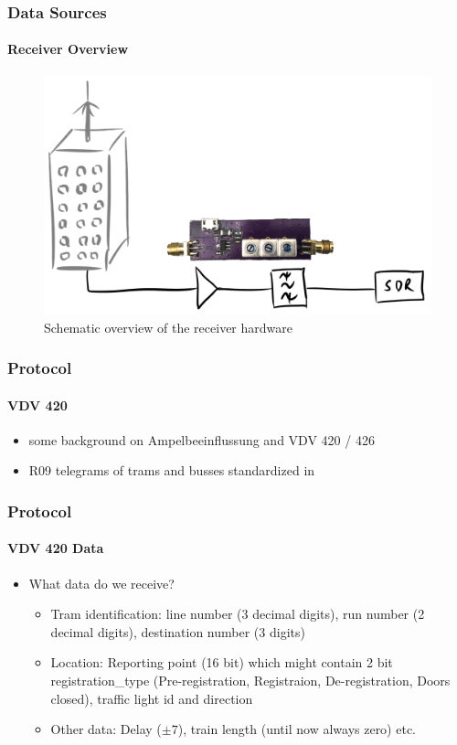 
\begin{frame}
\frametitle{Data Sources}
\framesubtitle{Receiver Overview}
\begin{figure}
\centering
\includegraphics[height=0.65\textheight]{figs/antenna-filter.pdf}
\caption{Schematic overview of the receiver hardware}
\end{figure}
\end{frame}


\begin{frame}
\frametitle{Protocol}
\framesubtitle{VDV 420}
	\begin{itemize}
		\item some background on Ampelbeeinflussung and VDV 420 / 426
		\item R09 telegrams of trams and busses standardized in 
	\end{itemize}
\end{frame}


\begin{frame}
\frametitle{Protocol}
\framesubtitle{VDV 420 Data}
\begin{itemize}
	\item What data do we receive?
	\begin{itemize}
		\item Tram identification: line number (3 decimal digits), run number (2 decimal digits), destination number (3 digits)
		\item Location: Reporting point (16 bit) which might contain 2 bit registration\_type (Pre-registration, Registraion, De-registration, Doors closed), traffic light id and direction
		\item Other data: Delay ($\pm 7$), train length (until now always zero) etc.
	\end{itemize}
\end{itemize}
\end{frame}


